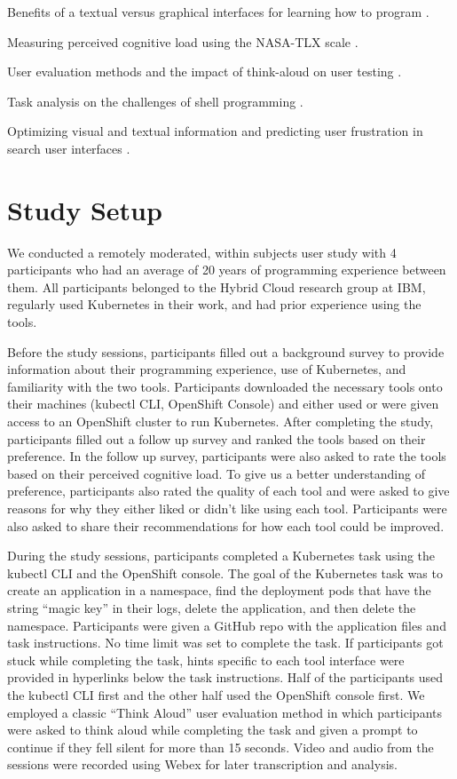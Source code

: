 \documentclass[11pt, oneside]{article}   	%
\begin{document}
Benefits of a textual versus graphical interfaces for learning how to program \cite{dillon2012comparing}.

Measuring perceived cognitive load using the NASA-TLX scale \cite{hart1988development}.

User evaluation methods and the impact of think-aloud on user testing \cite{mcdonald2020impact, ericsson1984protocol, fox2011procedures}. 

Task analysis on the challenges of shell programming \cite{gandhi2020lightening}.

Optimizing visual and textual information and predicting user frustration in search user interfaces \cite{treharne2012optimising, feild2010predicting}.


\section{Study Setup}
We conducted a remotely moderated, within subjects user study with 4 participants who had an average of 20 years of programming experience between them. All participants belonged to the Hybrid Cloud research group at IBM, regularly used Kubernetes in their work, and had prior experience using the tools. 

Before the study sessions, participants filled out a background survey to provide information about their programming experience, use of Kubernetes, and familiarity with the two tools. Participants downloaded the necessary tools onto their machines (kubectl CLI, OpenShift Console) and either used or were given access to an OpenShift cluster to run Kubernetes. After completing the study, participants filled out a follow up survey and ranked the tools based on their preference. In the follow up survey, participants were also asked to rate the tools based on their perceived cognitive load. To give us a better understanding of preference, participants also rated the quality of each tool and were asked to give reasons for why they either liked or didn’t like using each tool. Participants were also asked to share their recommendations for how each tool could be improved.

During the study sessions, participants completed a Kubernetes task using the kubectl CLI and the OpenShift console. The goal of the Kubernetes task was to create an application in a namespace, find the deployment pods that have the string ``magic key'' in their logs, delete the application, and then delete the namespace. Participants were given a GitHub repo with the application files and task instructions. No time limit was set to complete the task. If participants got stuck while completing the task, hints specific to each tool interface were provided in hyperlinks below the task instructions. Half of the participants used the kubectl CLI first and the other half used the OpenShift console first. We employed a classic ``Think Aloud'' user evaluation method in which participants were asked to think aloud while completing the task and given a prompt to continue if they fell silent for more than 15 seconds. Video and audio from the sessions were recorded using Webex for later transcription and analysis. 
\end{document}

